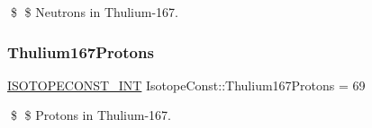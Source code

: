\$ \$ Neutrons in Thulium-\/167. \mbox{\label{group___isotope_const-_thulium-_tm167_ga0ff68da4ec8edd81013f21ca9ad8f8ec}} 
\subsubsection{\texorpdfstring{Thulium167\+Protons}{Thulium167Protons}}
{\footnotesize\ttfamily \mbox{\hyperlink{group___isotope_const-_macros_ga5f18360b3e99483a35c32d789e62621c}{I\+S\+O\+T\+O\+P\+E\+C\+O\+N\+S\+T\+\_\+\+I\+NT}} Isotope\+Const\+::\+Thulium167\+Protons = 69}

\$ \$ Protons in Thulium-\/167. 